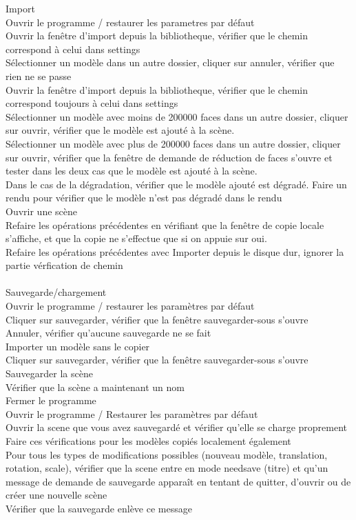 Import\\
		Ouvrir le programme / restaurer les parametres par défaut\\
		Ouvrir la fenêtre d'import depuis la bibliotheque, vérifier que le chemin correspond à celui dans settings\\
		Sélectionner un modèle dans un autre dossier, cliquer sur annuler, vérifier que rien ne se passe\\
		Ouvrir la fenêtre d'import depuis la bibliotheque, vérifier que le chemin correspond toujours à celui dans settings\\
		Sélectionner un modèle avec moins de 200000 faces dans un autre dossier, cliquer sur ouvrir, vérifier que le modèle est ajouté à la scène.\\
		Sélectionner un modèle avec plus de 200000 faces dans un autre dossier, cliquer sur ouvrir, vérifier que la fenêtre de demande de réduction de faces s'ouvre et tester dans les deux cas que le modèle est ajouté à la scène.\\
		Dans le cas de la dégradation, vérifier que le modèle ajouté est dégradé. Faire un rendu pour vérifier que le modèle n'est pas dégradé dans le rendu\\
		Ouvrir une scène \\
		Refaire les opérations précédentes en vérifiant que la fenêtre de copie locale s'affiche, et que la copie ne s'effectue que si on appuie sur oui.\\
		Refaire les opérations précédentes avec Importer depuis le disque dur, ignorer la partie vérfication de chemin\\
\\
		
Sauvegarde/chargement\\
		Ouvrir le programme / restaurer les paramètres par défaut\\
		Cliquer sur sauvegarder, vérifier que la fenêtre sauvegarder-sous s'ouvre\\
		Annuler, vérifier qu'aucune sauvegarde ne se fait\\
		Importer un modèle sans le copier\\
		Cliquer sur sauvegarder, vérifier que la fenêtre sauvegarder-sous s'ouvre\\
		Sauvegarder la scène\\
		Vérifier que la scène a maintenant un nom\\
		Fermer le programme\\
		Ouvrir le programme / Restaurer les paramètres par défaut\\
		Ouvrir la scene que vous avez sauvegardé et vérifier qu'elle se charge proprement \\
		Faire ces vérifications pour les modèles copiés localement également\\
		Pour tous les types de modifications possibles (nouveau modèle, translation, rotation, scale), vérifier que la scene entre en mode needsave (titre) et qu'un message de demande de sauvegarde apparaît en tentant de quitter, d'ouvrir ou de créer une nouvelle scène\\
		Vérifier que la sauvegarde enlève ce message\\
		\\

